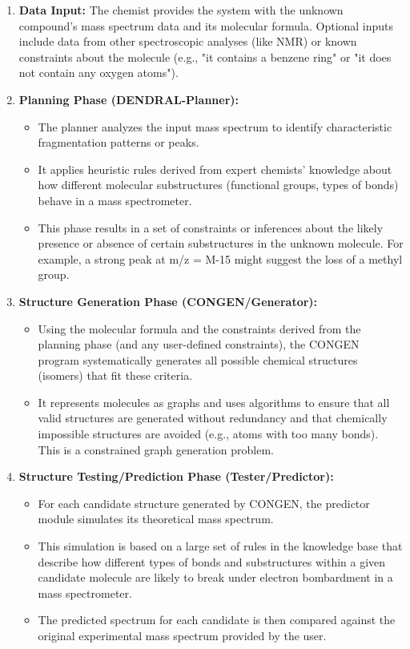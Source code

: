 \documentclass[12pt,a4paper]{article}
\begin{document}
\begin{enumerate}
    \item \textbf{Data Input:} The chemist provides the system with the unknown compound's mass spectrum data and its molecular formula. Optional inputs include data from other spectroscopic analyses (like NMR) or known constraints about the molecule (e.g., "it contains a benzene ring" or "it does not contain any oxygen atoms").
    
    \item \textbf{Planning Phase (DENDRAL-Planner):}
        \begin{itemize}
            \item The planner analyzes the input mass spectrum to identify characteristic fragmentation patterns or peaks.
            \item It applies heuristic rules derived from expert chemists' knowledge about how different molecular substructures (functional groups, types of bonds) behave in a mass spectrometer.
            \item This phase results in a set of constraints or inferences about the likely presence or absence of certain substructures in the unknown molecule. For example, a strong peak at m/z = M-15 might suggest the loss of a methyl group.
        \end{itemize}

    \item \textbf{Structure Generation Phase (CONGEN/Generator):}
        \begin{itemize}
            \item Using the molecular formula and the constraints derived from the planning phase (and any user-defined constraints), the CONGEN program systematically generates all possible chemical structures (isomers) that fit these criteria.
            \item It represents molecules as graphs and uses algorithms to ensure that all valid structures are generated without redundancy and that chemically impossible structures are avoided (e.g., atoms with too many bonds). This is a constrained graph generation problem.
        \end{itemize}
        
    \item \textbf{Structure Testing/Prediction Phase (Tester/Predictor):}
        \begin{itemize}
            \item For each candidate structure generated by CONGEN, the predictor module simulates its theoretical mass spectrum.
            \item This simulation is based on a large set of rules in the knowledge base that describe how different types of bonds and substructures within a given candidate molecule are likely to break under electron bombardment in a mass spectrometer.
            \item The predicted spectrum for each candidate is then compared against the original experimental mass spectrum provided by the user.
        \end{itemize}
        

\end{enumerate}
\end{document}
